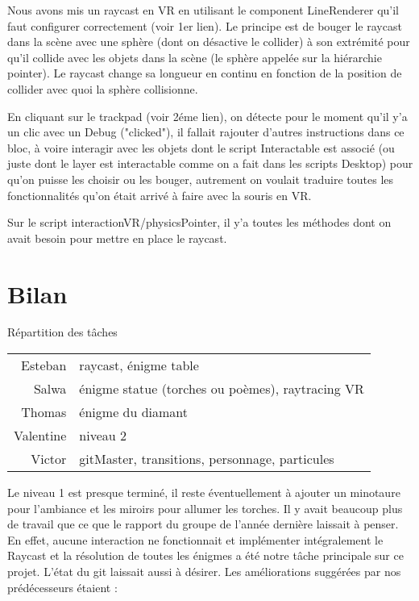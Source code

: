 \documentclass[12pt]{article}
\begin{document}
Nous avons mis un raycast en VR en utilisant le component LineRenderer qu’il faut configurer correctement (voir 1er lien). Le principe est de bouger le raycast dans la scène avec une sphère (dont on désactive le collider) à son extrémité pour qu’il collide avec les objets dans la scène (le sphère appelée sur la hiérarchie pointer). Le raycast change sa longueur en continu en fonction de la position de collider avec quoi la sphère collisionne.

En cliquant sur le trackpad (voir 2éme lien), on détecte pour le moment qu’il y’a un clic avec un Debug ("clicked"), il fallait rajouter d’autres instructions dans ce bloc, à voire interagir avec les objets dont le script Interactable est associé (ou juste dont le layer est interactable comme on a fait dans les scripts Desktop) pour qu’on puisse les choisir ou les bouger, autrement on voulait traduire toutes les fonctionnalités qu’on était arrivé à faire avec la souris en VR.

Sur le script interactionVR/physicsPointer, il y’a toutes les méthodes dont on avait besoin pour mettre en place le raycast.

\section{Bilan}

Répartition des tâches
\begin{center}
    \begin{tabular}{r|l}
        Esteban   & raycast, énigme table                            \\
        Salwa     & énigme statue (torches ou poèmes), raytracing VR \\
        Thomas    & énigme du diamant                                \\
        Valentine & niveau 2                                         \\
        Victor    & gitMaster, transitions, personnage, particules
    \end{tabular}
\end{center}

Le niveau 1 est presque terminé, il reste éventuellement à ajouter un minotaure pour l’ambiance et les miroirs pour allumer les torches. Il y avait beaucoup plus de travail que ce que le rapport du groupe de l’année dernière laissait à penser. En effet, aucune interaction ne fonctionnait et implémenter intégralement le Raycast et la résolution de toutes les énigmes a été notre tâche principale sur ce projet. L'état du git laissait aussi à désirer. Les améliorations suggérées par nos prédécesseurs étaient :
\end{document}
